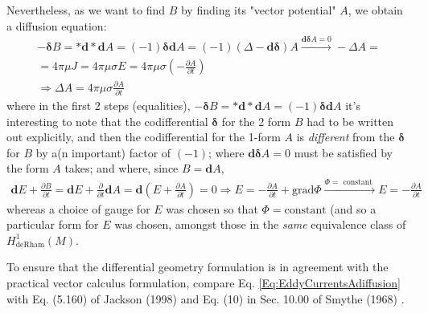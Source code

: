 \documentclass[10pt]{amsart}
\begin{document}
\begin{multicols*}{2}
Nevertheless, as we want to find $B$ by finding its "vector potential" $A$, we obtain a diffusion equation: 
\begin{equation}\label{Eq:EddyCurrentsAdiffusion}
\begin{gathered}
	- \mathbf{\delta}B = \mathbf{*d*d}A = (-1) \mathbf{\delta d} A = (-1)( \Delta - \mathbf{d\delta} ) A \xrightarrow{ \mathbf{d\delta} A = 0 } - \Delta A = \\
	= 4\pi \mu J = 4\pi \mu \sigma E = 4\pi \mu \sigma \left( -\frac{ \partial A}{ \partial t} \right) \\
\Longrightarrow \boxed{ \Delta A = 4\pi \mu \sigma \frac{ \partial A}{ \partial t } }
\end{gathered}
\end{equation}
where in the first 2 steps (equalities), $- \mathbf{\delta}B = \mathbf{*d*d}A = (-1) \mathbf{\delta d} A$ it's interesting to note that the codifferential $\mathbf{\delta}$ for the 2 form $B$ had to be written out explicitly, and then the codifferential for the 1-form $A$ is \emph{different} from the $\mathbf{\delta}$ for $B$ by a(n important) factor of $(-1)$; where $\mathbf{d\delta} A=0$ must be satisfied by the form $A$ takes; and where, since $B=\mathbf{d}A$,
\begin{equation}
\begin{gathered}
	\mathbf{d}E + \frac{ \partial B}{ \partial t} = \mathbf{d} E + \frac{ \partial }{ \partial t} \mathbf{d} A = \mathbf{d} \left( E+ \frac{ \partial A}{ \partial t} \right) = 0 \Longrightarrow E = -\frac{ \partial A}{ \partial t} + \text{grad}\Phi \xrightarrow{ \Phi = \text{ constant } } E = -\frac{ \partial A}{ \partial t}
\end{gathered}
\end{equation}
whereas a choice of gauge for $E$ was chosen so that $\Phi=\text{constant}$ (and so a particular form for $E$ was chosen, amongst those in the \emph{same} equivalence class of $H^1_{\text{deRham}}(M)$.  

To ensure that the differential geometry formulation is in agreement with the practical vector calculus formulation, compare Eq. \ref{Eq:EddyCurrentsAdiffusion} with Eq. (5.160) of Jackson (1998) \cite{Jack1998} and Eq. (10) in Sec. 10.00 of Smythe (1968) \cite{Smyt1968}.  


\end{multicols*}
\end{document}
